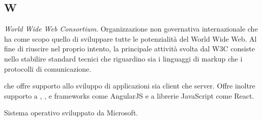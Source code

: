 	\subsection{W}
	
		\textit{World Wide Web Consortium}. Organizzazione non governativa internazionale che ha come scopo quello di sviluppare tutte le potenzialità del World Wide Web. Al fine di riuscire nel proprio intento, la principale attività svolta dal W3C consiste nello stabilire standard tecnici che riguardino sia i linguaggi di markup che i protocolli di comunicazione.
		
		 che offre supporto allo sviluppo di applicazioni  sia client che server. Offre inoltre supporto a , ,  e frameworks come AngularJS e a librerie JavaScript come React.
		
		Sistema operativo sviluppato da Microsoft.
